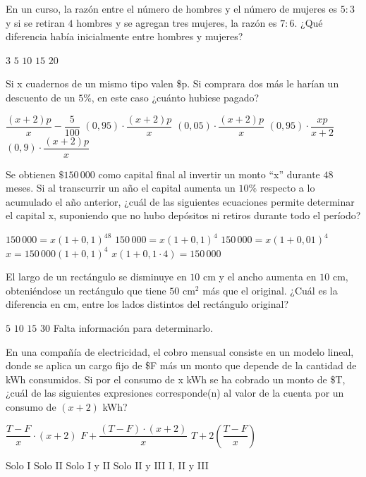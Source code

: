 \documentclass[sin nombre]{srs}
\begin{document}
\begin{preguntas}[after-item-skip=2cm]
\pregunta En un curso, la razón entre el número de hombres y el número de mujeres es $5 : 3$ y si se retiran $4$ hombres y se agregan tres mujeres, la razón es $7 : 6$. ¿Qué diferencia había inicialmente entre hombres y mujeres?
\begin{vertical}
\alternativa $3$
\alternativa $5$
\alternativa $10$
\alternativa $15$
\alternativa $20$
\end{vertical}

\pregunta Si x cuadernos de un mismo tipo valen \$p. Si comprara dos más le harían un descuento de un $5\%$, en este caso ¿cuánto hubiese pagado?
\begin{vertical}
\alternativa $\dfrac{\left(x + 2\right)p}{x} - \dfrac{5}{100}$
\alternativa $\left(0,95\right) \cdot \dfrac{\left(x + 2\right)p}{x}$
\alternativa $\left(0,05\right) \cdot \dfrac{\left(x + 2\right)p}{x}$
\alternativa $\left(0,95\right) \cdot \dfrac{xp}{x + 2}$
\alternativa $\left(0,9\right) \cdot \dfrac{\left(x + 2\right)p}{x}$
\end{vertical}

\pregunta Se obtienen $\$150\,000$ como capital final al invertir un monto “x” durante $48$ meses. Si al transcurrir un año el capital aumenta un $10\%$ respecto a lo acumulado el año anterior, ¿cuál de las siguientes ecuaciones permite determinar el capital x, suponiendo que no hubo depósitos ni retiros durante todo el período?
\begin{vertical}
\alternativa $150\,000 = x\left(1 + 0,1\right)^{48}$
\alternativa $150\,000 = x\left(1 + 0,1\right)^4$
\alternativa $150\,000 = x\left(1 + 0,01\right)^4$
\alternativa $x = 150\,000\left(1 + 0,1\right)^4$
\alternativa $x\left(1 + 0,1 \cdot 4\right) = 150\,000$
\end{vertical}

\pregunta El largo de un rectángulo se disminuye en $10 \text{ cm}$ y el ancho aumenta en $10 \text{ cm}$, obteniéndose un rectángulo que tiene $50 \text{ cm}^2$ más que el original. ¿Cuál es la diferencia en cm, entre los lados distintos del rectángulo original?
\begin{vertical}
\alternativa $5$
\alternativa $10$
\alternativa $15$
\alternativa $30$
\alternativa Falta información para determinarlo.
\end{vertical}

\pregunta En una compañía de electricidad, el cobro mensual consiste en un modelo lineal, donde se aplica un cargo fijo de \$F más un monto que depende de la cantidad de kWh consumidos. Si por el consumo de x kWh se ha cobrado un monto de \$T, ¿cuál de las siguientes expresiones corresponde(n) al valor de la cuenta por un consumo de $\left(x + 2\right)$ kWh?
\begin{verticali}
\alternativa $\dfrac{T - F}{x} \cdot \left(x + 2\right)$
\alternativa $F + \dfrac{\left(T - F\right) \cdot \left(x + 2\right)}{x}$
\alternativa $T + 2 \left(\dfrac{T - F}{x}\right)$
\end{verticali}
\begin{vertical}
\alternativa Solo I
\alternativa Solo II
\alternativa Solo I y II
\alternativa Solo II y III
\alternativa I, II y III
\end{vertical}


\end{preguntas}
\end{document}
